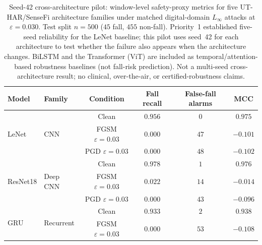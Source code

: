 
\begin{table}[t]
  \centering
  \caption[Seed-42 cross-architecture adversarial safety-proxy comparison]{%
    Seed-42 cross-architecture pilot: window-level safety-proxy metrics for five
    UT-HAR/SenseFi architecture families under matched digital-domain $L_\infty$
    attacks at $\varepsilon=0.030$. Test split $n=500$ ($45$ fall, $455$
    non-fall). Priority~1 established five-seed reliability for the LeNet baseline;
    this pilot uses seed~42 for each architecture to test whether the failure also
    appears when the architecture changes. BiLSTM and the Transformer (ViT) are
    included as temporal/attention-based robustness baselines (not fall-risk
    prediction). Not a multi-seed cross-architecture result; no clinical,
    over-the-air, or certified-robustness claims.}
  \label{tab:cross-arch-seed42}
  \begin{tabular}{l l c c c c}
    \toprule
    Model & Family & Condition & Fall recall & False-fall alarms & MCC \\
    \midrule
    \multirow{3}{*}{LeNet} & \multirow{3}{*}{CNN}
      & Clean              & $0.956$ & $0$  & $0.975$ \\
    & & FGSM $\varepsilon{=}0.03$ & $0.000$ & $47$ & $-0.101$ \\
    & & PGD $\varepsilon{=}0.03$  & $0.000$ & $48$ & $-0.102$ \\
    \midrule
    \multirow{3}{*}{ResNet18} & \multirow{3}{*}{Deep CNN}
      & Clean              & $0.978$ & $1$  & $0.976$ \\
    & & FGSM $\varepsilon{=}0.03$ & $0.022$ & $14$ & $-0.014$ \\
    & & PGD $\varepsilon{=}0.03$  & $0.000$ & $43$ & $-0.096$ \\
    \midrule
    \multirow{3}{*}{GRU} & \multirow{3}{*}{Recurrent}
      & Clean              & $0.933$ & $2$  & $0.938$ \\
    & & FGSM $\varepsilon{=}0.03$ & $0.000$ & $53$ & $-0.108$ \\

\end{tabular}
\end{table}
